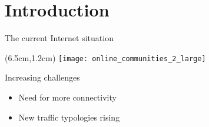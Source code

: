 \section{Introduction}
\begin{frame}{The current Internet situation}
  \begin{textblock*}{5cm}(6.5cm,1.2cm)
    \texttt{[image: online\_communities\_2\_large]}
  \end{textblock*}

  Increasing challenges
  \begin{itemize}
  \item<1-> Need for more connectivity
  \item<2-> New traffic typologies rising
  \end{itemize}
\end{frame}
